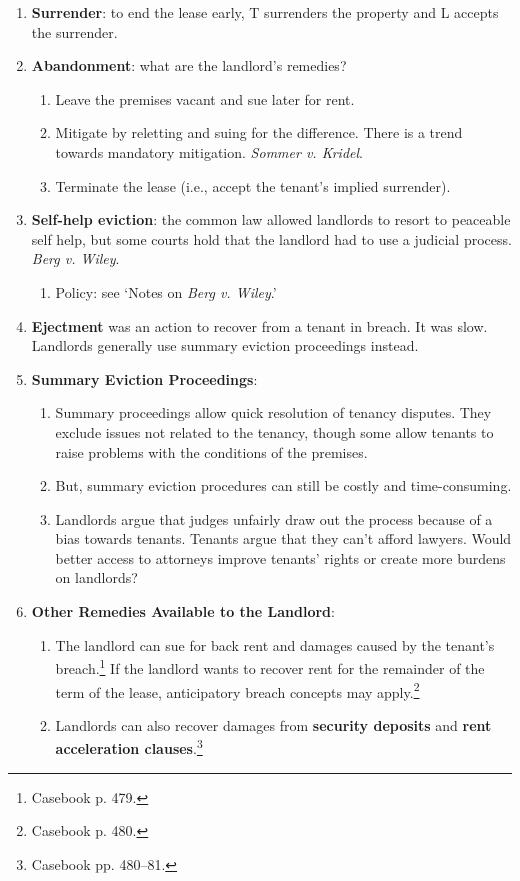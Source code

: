 \begin{enumerate}
    \item \textbf{Surrender}: to end the lease early, T surrenders the 
    property and L accepts the surrender.
    \item \textbf{Abandonment}: what are the landlord's remedies?
    \begin{enumerate}
        \item Leave the premises vacant and sue later for rent.
        \item Mitigate by reletting and suing for the difference. There is a 
        trend towards mandatory mitigation. \emph{Sommer v. Kridel}.
        \item Terminate the lease (i.e., accept the tenant's implied 
        surrender).
    \end{enumerate}
    \item \textbf{Self-help eviction}: the common law allowed landlords to 
    resort to peaceable self help, but some courts hold that the landlord had 
    to use a judicial process. \emph{Berg v. Wiley}.
    \begin{enumerate}
        \item Policy: see `Notes on \emph{Berg v. Wiley}.'
    \end{enumerate}
    \item \textbf{Ejectment} was an action to recover from a tenant in breach. 
    It was slow. Landlords generally use summary eviction proceedings instead.
    \item \textbf{Summary Eviction Proceedings}:
    \begin{enumerate}
        \item Summary proceedings allow quick resolution of tenancy disputes.  
        They exclude issues not related to the tenancy, though some allow 
        tenants to raise problems with the conditions of the premises.
        \item But, summary eviction procedures can still be costly and 
        time-consuming.
        \item Landlords argue that judges unfairly draw out the process 
        because of a bias towards tenants. Tenants argue that they can't 
        afford lawyers.  Would better access to attorneys improve tenants' 
        rights or create more burdens on landlords?
    \end{enumerate}
    \item \textbf{Other Remedies Available to the Landlord}:
    \begin{enumerate}
        \item The landlord can sue for back rent and damages caused by the 
        tenant's breach.\footnote{Casebook p. 479.} If the landlord wants to 
        recover rent for the remainder of the term of the lease, anticipatory 
        breach concepts may apply.\footnote{Casebook p. 480.}
        \item Landlords can also recover damages from \textbf{security 
        deposits} and \textbf{rent acceleration clauses}.\footnote{Casebook 
        pp. 480--81.}
    \end{enumerate}
\end{enumerate}

